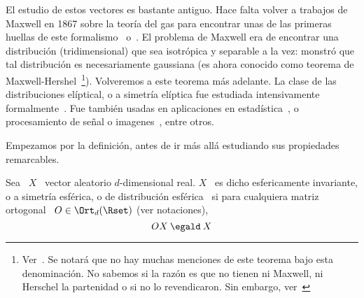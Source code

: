 \label{Ssec:MP:FamiliaEliptica}



\label{Ssec:MP:FamiliaElipticaReal}


El estudio de  estos vectores es bastante antiguo. Hace  falta volver a trabajos
de Maxwell en 1867 sobre la teor\'ia del gas para encontrar unas de las primeras
huellas  de  este  formalismo~\cite{Max67} o~\cite[pp.~377--391]{Nie52:v1}.   El
problema de Maxwell era de encontrar una distribuci\'on (tridimensional) que sea
isotr\'opica  y  separable  a  la  vez:  monstr\'o  que  tal  distribuci\'on  es
necesariamente    gaussiana    (es    ahora    conocido    como    teorema    de
Maxwell-Hershel~\footnote{Ver~\cite[Prop.~4.11]{BilBre99}.   Se notar\'a  que no
  hay muchas menciones  de este teorema bajo esta  denominaci\'on. No sabemos si
  la raz\'on es que  no tienen ni Maxwell, ni Herschel la  partenidad o si no lo
  revendicaron.  Sin  embargo, ver~\cite{Max67}}).   Volveremos  a este  teorema
m\'as  adelante. La  clase de  las  distribuciones el\'iptical,  o a  simetr\'ia
el\'iptica  fue   estudiada  intensivamente  formalmente~\cite{Bar34,  Bar34:07,
  Ver64,  McgWag68, CamHua81,  Eat81, Kan94,  Lau75, Yao73,  KotNad01, FanKot90,
  Mui82,    BilBre99}.     Fue    tambi\'en    usadas   en    aplicaciones    en
estad\'istica~\cite{BlaTho68, Chu73, YanKot03,  ArePin06, BauPas07, ChiPas08}, o
procesamiento de  se\~nal o imagenes~\cite{Gol76,  RanWei93, RanWei95, ZozVig10,
  Zoz12}, entre otros.

Empezamos  por  la  definici\'on,  antes  de  ir  m\'as  all\'a  estudiando  sus
propiedades remarcables.

\begin{definicion}
  Sea  \  $X$  \  vector   aleatorio  $d$-dimensional  real.   $X$  \  es  dicho
  esfericamente  invariante,  o a  simetr\'ia  esf\'erica,  o de  distribuci\'on
  esf\'erica \ si  para cualquiera matriz ortogonal \  $O \in \Ort_d(\Rset)$ (ver
  notaciones),
  \[
  O  X  \: \egald  \: X
  \]
\end{definicion}

